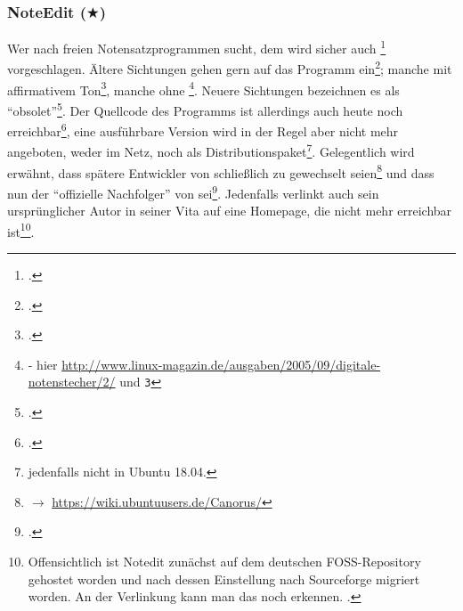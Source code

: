 %
%
%



\subsubsection{NoteEdit ($\bigstar$)}

Wer nach freien Notensatzprogrammen sucht, dem wird sicher auch
\footcite[vgl.][\nopage wp]{Andres2002a} vorgeschlagen. Ältere
Sichtungen gehen gern auf das Programm ein\footcite[vgl.][\nopage
wp]{Roitman2007a}; manche mit affirmativem Ton\footcite[vgl.][\nopage
wp]{LinuxSoundNotation2006a}, manche ohne
\footnote{\cite[vgl.][\nopage]{Brendel2005a} - hier
\href{http://www.linux-magazin.de/ausgaben/2005/09/digitale-notenstecher/2/}
{http://www.linux-magazin.de/ausgaben/2005/09/digitale-notenstecher/2/} und
\texttt{\/3\/}}. Neuere Sichtungen bezeichnen es als
\enquote{obsolet}\footcite[vgl.][\nopage wp]{WpedNotensatz2019a}.
Der Quellcode des Programms ist allerdings auch heute noch
erreichbar\footcite[vgl.][\nopage]{NoteeditRep2014a}, eine ausführbare Version
wird in der Regel aber nicht mehr angeboten, weder im Netz, noch als
Distri\-bu\-tions\-paket\footnote{jedenfalls nicht in Ubuntu 18.04.}. Gelegentlich wird
erwähnt, dass spätere Entwickler von  schließlich zu 
gewechselt seien\footnote{$\rightarrow$
\href{https://wiki.ubuntuusers.de/Canorus/}{https://wiki.ubuntuusers.de/Canorus/}
} und dass  nun der \enquote{offizielle Nachfolger} von
 sei\footcite[vgl.][\nopage wp]{WpedCanorus2019a}.
Jedenfalls verlinkt auch sein ursprünglicher Autor  in seiner Vita
auf eine Homepage, die nicht mehr erreichbar ist\footnote{Offensichtlich ist
Notedit zunächst auf dem deutschen FOSS-Repository  gehostet worden
und nach dessen Einstellung nach Sourceforge migriert worden. An der Verlinkung
kann man das noch erkennen. \cite[vgl. dazu][\nopage wp]{Andres2018a}.}.

